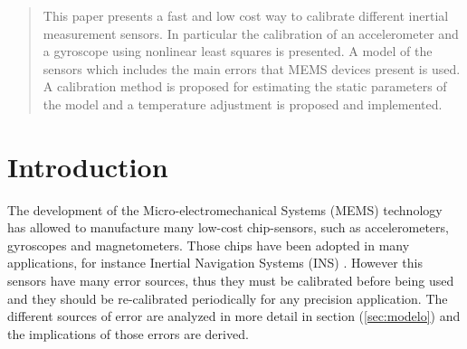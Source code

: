 \documentclass[conference]{IEEEtran}
\newcommand{\refp}[1]{(\ref{#1})}
\begin{document}




\maketitle


\begin{abstract}
This paper presents a fast and low cost way to calibrate different inertial measurement sensors. In particular the calibration of an accelerometer and a gyroscope using nonlinear least squares is presented. A model of the sensors which includes the main errors that MEMS devices present is used. A calibration method is proposed for estimating the static parameters of the model and a temperature adjustment is proposed and implemented.

\end{abstract}





%
\IEEEpeerreviewmaketitle

\section{Introduction}
The development of the Micro-electromechanical Systems (MEMS) technology has allowed to manufacture many low-cost chip-sensors, such as accelerometers, gyroscopes and magnetometers. Those chips have been adopted in many applications, for instance Inertial Navigation Systems (INS) \cite{bib:un_puto_nuevo}. However this sensors have many error sources, thus they must be calibrated before being used and they should be re-calibrated periodically for any precision application. The different sources of error are analyzed in more detail in section \refp{sec:modelo} and the implications of those errors are derived.\\ 
\end{document}
